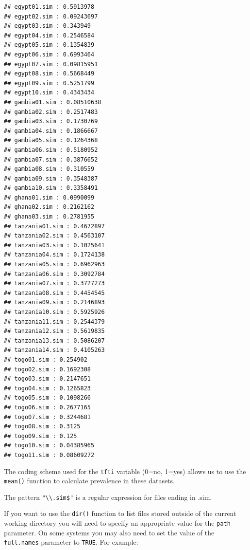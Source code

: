 \documentclass[12pt,a4paper]{book}
\newenvironment{Shaded}{\begin{snugshade}}{\end{snugshade}}
\newcommand{\CharTok}[1]{\textcolor[rgb]{0.31,0.60,0.02}{#1}}
\newcommand{\ControlFlowTok}[1]{\textcolor[rgb]{0.13,0.29,0.53}{\textbf{#1}}}
\newcommand{\DataTypeTok}[1]{\textcolor[rgb]{0.13,0.29,0.53}{#1}}
\newcommand{\KeywordTok}[1]{\textcolor[rgb]{0.13,0.29,0.53}{\textbf{#1}}}
\newcommand{\NormalTok}[1]{#1}
\newcommand{\OperatorTok}[1]{\textcolor[rgb]{0.81,0.36,0.00}{\textbf{#1}}}
\newcommand{\OtherTok}[1]{\textcolor[rgb]{0.56,0.35,0.01}{#1}}
\newcommand{\StringTok}[1]{\textcolor[rgb]{0.31,0.60,0.02}{#1}}
\theoremstyle{definition}
\theoremstyle{definition}
\theoremstyle{definition}
\theoremstyle{remark}
\begin{document}
\begin{verbatim}
## egypt01.sim : 0.5913978 
## egypt02.sim : 0.09243697 
## egypt03.sim : 0.343949 
## egypt04.sim : 0.2546584 
## egypt05.sim : 0.1354839 
## egypt06.sim : 0.6993464 
## egypt07.sim : 0.09815951 
## egypt08.sim : 0.5668449 
## egypt09.sim : 0.5251799 
## egypt10.sim : 0.4343434 
## gambia01.sim : 0.08510638 
## gambia02.sim : 0.2517483 
## gambia03.sim : 0.1730769 
## gambia04.sim : 0.1866667 
## gambia05.sim : 0.1264368 
## gambia06.sim : 0.5180952 
## gambia07.sim : 0.3876652 
## gambia08.sim : 0.310559 
## gambia09.sim : 0.3548387 
## gambia10.sim : 0.3358491 
## ghana01.sim : 0.0990099 
## ghana02.sim : 0.2162162 
## ghana03.sim : 0.2781955 
## tanzania01.sim : 0.4672897 
## tanzania02.sim : 0.4563107 
## tanzania03.sim : 0.1025641 
## tanzania04.sim : 0.1724138 
## tanzania05.sim : 0.6962963 
## tanzania06.sim : 0.3092784 
## tanzania07.sim : 0.3727273 
## tanzania08.sim : 0.4454545 
## tanzania09.sim : 0.2146893 
## tanzania10.sim : 0.5925926 
## tanzania11.sim : 0.2544379 
## tanzania12.sim : 0.5619835 
## tanzania13.sim : 0.5086207 
## tanzania14.sim : 0.4105263 
## togo01.sim : 0.254902 
## togo02.sim : 0.1692308 
## togo03.sim : 0.2147651 
## togo04.sim : 0.1265823 
## togo05.sim : 0.1098266 
## togo06.sim : 0.2677165 
## togo07.sim : 0.3244681 
## togo08.sim : 0.3125 
## togo09.sim : 0.125 
## togo10.sim : 0.04385965 
## togo11.sim : 0.08609272
\end{verbatim}

The coding scheme used for the \texttt{tfti} variable (0=no, 1=yes)
allows us to use the \texttt{mean()} function to calculate prevalence in
these datasets.

The pattern \texttt{"\textbackslash{}\textbackslash{}.sim\$"} is a
regular expression for files ending in .sim.

If you want to use the \texttt{dir()} function to list files stored
outside of the current working directory you will need to specify an
appropriate value for the \texttt{path} parameter. On some systems you
may also need to set the value of the \texttt{full.names} parameter to
\texttt{TRUE}. For example:

\begin{Shaded}
\end{Shaded}
\end{document}
